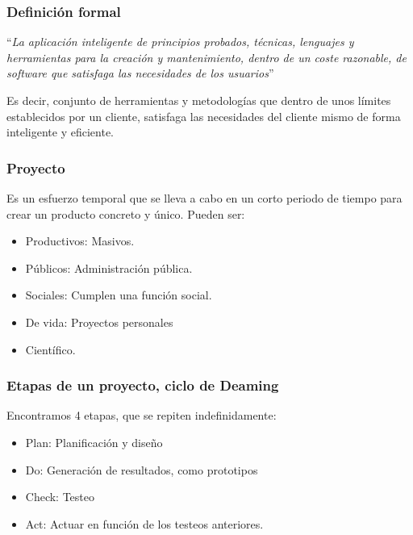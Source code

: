\subsubsection{Definición formal}
\noindent ``\textit{La aplicación inteligente de principios probados,
        técnicas, lenguajes y herramientas para la creación
        y mantenimiento, dentro de un coste razonable, de
        software que satisfaga las necesidades de los
        usuarios}''\par \noindent Es decir, conjunto de herramientas y metodologías que dentro de unos límites establecidos por un cliente, satisfaga las necesidades del cliente mismo de forma inteligente y eficiente.
\subsubsection{Proyecto}
\noindent Es un esfuerzo temporal que se lleva a cabo en un corto periodo de tiempo para crear un producto concreto y único. Pueden ser:
\begin{itemize}
        \item Productivos: Masivos.
        \item Públicos: Administración pública.
        \item Sociales: Cumplen una función social.
        \item De vida: Proyectos personales
        \item Científico.
\end{itemize}
\subsubsection{Etapas de un proyecto, ciclo de Deaming}
\noindent Encontramos 4 etapas, que se repiten indefinidamente:
\begin{itemize}
        \item Plan: Planificación y diseño
        \item Do: Generación de resultados, como prototipos
        \item Check: Testeo
        \item Act: Actuar en función de los testeos anteriores.
\end{itemize}
